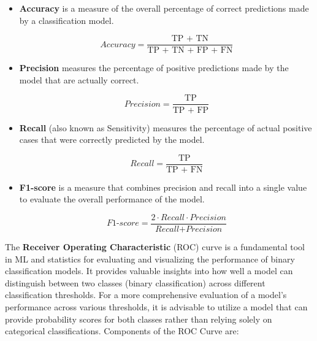 \begin{itemize}
  \item{

  \textbf{Accuracy} is a measure of the overall percentage of correct predictions made by a classification model.

  \begin{equation}
    \textit{Accuracy} = \frac{\text{TP + TN}}{\text{TP + TN + FP + FN}}
    \label{formula:accuracy}
  \end{equation}

  }
  \item{

  \textbf{Precision} measures the percentage of positive predictions made by the model that are actually correct.

  \begin{equation}
    \textit{Precision} = \frac{\text{TP}}{\text{TP + FP}}
    \label{formula:precision}
  \end{equation}

  }
  \item{

  \textbf{Recall} (also known as Sensitivity)  measures the percentage of actual positive cases that were correctly predicted by the model.

  \begin{equation}
    \textit{Recall} = \frac{\text{TP}}{\text{TP + FN}}
    \label{formula:recall}
  \end{equation}

  }
  \item{

  \textbf{F1-score} is a measure that combines precision and recall into a single value to evaluate the overall performance of the model.


  \begin{equation}
    \textit{F1-score} = \frac{2 \cdot \textit{Recall} \cdot \textit{Precision}}{\textit{Recall} + \textit{Precision}}
    \label{formula:f1}
  \end{equation}
  
  }
\end{itemize} 


The \textbf{Receiver Operating Characteristic} (ROC) curve  is a fundamental tool in ML and statistics for evaluating and visualizing the performance of binary classification models. 
It provides valuable insights into how well a model can distinguish between two classes (binary classification) across different classification thresholds.
For a more comprehensive evaluation of a model's performance across various thresholds, 
it is advisable to utilize a model that can provide probability scores for both classes rather than relying solely on categorical classifications.
Components of the ROC Curve are:

